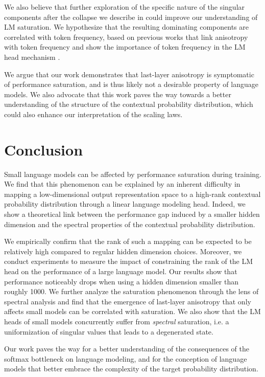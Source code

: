 We also believe that further exploration of the specific nature of the singular components after the collapse we describe in  could improve our understanding of LM saturation. We hypothesize that the resulting dominating components are correlated with token frequency, based on previous works that link anisotropy with token frequency \citep{gao2018representation,ethayarajh-2019-contextual,bis-etal-2021-much} and show the importance of token frequency in the LM head mechanism \citep{meister-etal-2023-natural}.

We argue that our work demonstrates that last-layer anisotropy is symptomatic of performance saturation, and is thus likely not a desirable property of language models. We also advocate that this work paves the way towards a better understanding of the structure of the contextual probability distribution, which could also enhance our interpretation of the scaling laws.

\section*{Conclusion}
Small language models can be affected by performance saturation during training. We find that this phenomenon can be explained by an inherent difficulty in mapping a low-dimensional output representation space to a high-rank contextual probability distribution through a linear language modeling head. Indeed, we show a theoretical link between the performance gap induced by a smaller hidden dimension and the spectral properties of the contextual probability distribution.

We empirically confirm that the rank of such a mapping can be expected to be relatively high compared to regular hidden dimension choices. Moreover, we conduct experiments to measure the impact of constraining the rank of the LM head on the performance of a large language model. Our results show that performance noticeably drops when using a hidden dimension smaller than roughly 1000. We further analyze the saturation phenomenon through the lens of spectral analysis and find that the emergence of last-layer anisotropy that only affects small models can be correlated with saturation. We also show that the LM heads of small models concurrently suffer from \textit{spectral} saturation, i.e. a uniformization of singular values that leads to a degenerated state.

Our work paves the way for a better understanding of the consequences of the softmax bottleneck on language modeling, and for the conception of language models that better embrace the complexity of the target probability distribution.

